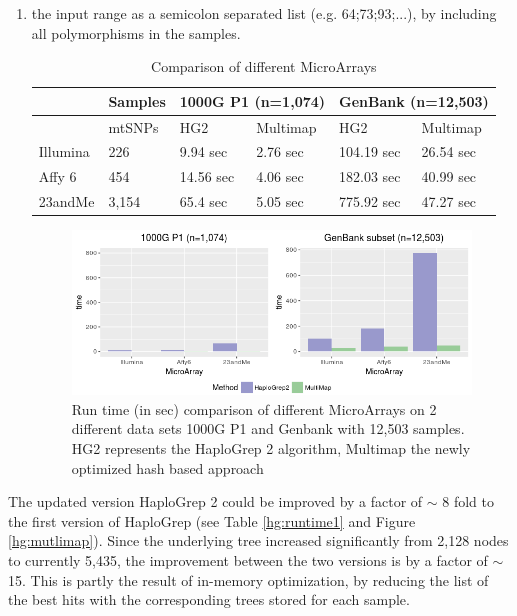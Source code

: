 \begin{enumerate}[label=(\alph*)]
\item  the input range as a semicolon separated list (e.g. 64;73;93;...), by including all polymorphisms in the samples. 

\begin{table}[H]
\centering
\caption{Comparison of different MicroArrays}
\label{hg:}
\begin{tabular}{ll|l|l|l|l|}
\cline{3-6}
                               & Samples & \multicolumn{2}{l|}{1000G P1 (n=1,074)} & \multicolumn{2}{l|}{GenBank (n=12,503)} \\ \hline
\multicolumn{1}{|l|}{}         & mtSNPs  & HG2               & Multimap            & HG2              & Multimap           \\ \hline
\multicolumn{1}{|l|}{Illumina} & 226     & 9.94   sec            & 2.76   sec              & 104.19   sec        & 26.54    sec          \\ \hline
\multicolumn{1}{|l|}{Affy 6}   & 454     & 14.56 sec             & 4.06   sec              & 182.03     sec      & 40.99   sec           \\ \hline
\multicolumn{1}{|l|}{23andMe}  & 3,154   & 65.4   sec            & 5.05   sec              & 775.92      sec     &       47.27    sec         \\ \hline
\end{tabular}
\end{table}
\begin{figure}[!ht]
    \centering
    \includegraphics[width=1\textwidth]{images/multimap2.png}
    \caption[Run time (in sec) comparison of HaploGrep versions]{Run time (in sec) comparison of different MicroArrays on 2 different data sets 1000G P1 and Genbank with 12,503 samples. HG2 represents the HaploGrep 2 algorithm, Multimap the newly optimized hash based approach} 
    \label{hg:multimap2}
\end{figure}
\end{enumerate}

The updated version HaploGrep 2 could be improved by a factor of $\sim$ 8 fold to the first version of HaploGrep (see Table \ref{hg:runtime1} and Figure \ref{hg:mutlimap}). Since the underlying tree increased significantly from 2,128 nodes to currently 5,435, the improvement between the two versions is by a factor of $\sim$ 15. This is partly the result of in-memory optimization, by reducing the list of the best hits with the corresponding trees stored for each sample. 

